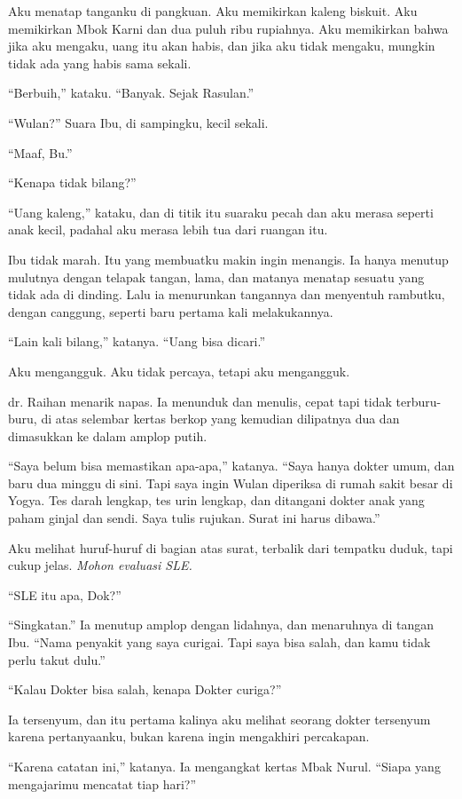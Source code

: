 \documentclass[11pt,twoside,openany]{book}
\begin{document}
Aku menatap tanganku di pangkuan. Aku memikirkan kaleng biskuit. Aku memikirkan Mbok Karni dan dua puluh ribu rupiahnya. Aku memikirkan bahwa jika aku mengaku, uang itu akan habis, dan jika aku tidak mengaku, mungkin tidak ada yang habis sama sekali.

``Berbuih,'' kataku. ``Banyak. Sejak Rasulan.''

``Wulan?'' Suara Ibu, di sampingku, kecil sekali.

``Maaf, Bu.''

``Kenapa tidak bilang?''

``Uang kaleng,'' kataku, dan di titik itu suaraku pecah dan aku merasa seperti anak kecil, padahal aku merasa lebih tua dari ruangan itu.

Ibu tidak marah. Itu yang membuatku makin ingin menangis. Ia hanya menutup mulutnya dengan telapak tangan, lama, dan matanya menatap sesuatu yang tidak ada di dinding. Lalu ia menurunkan tangannya dan menyentuh rambutku, dengan canggung, seperti baru pertama kali melakukannya.

``Lain kali bilang,'' katanya. ``Uang bisa dicari.''

Aku mengangguk. Aku tidak percaya, tetapi aku mengangguk.

dr. Raihan menarik napas. Ia menunduk dan menulis, cepat tapi tidak terburu-buru, di atas selembar kertas berkop yang kemudian dilipatnya dua dan dimasukkan ke dalam amplop putih.

``Saya belum bisa memastikan apa-apa,'' katanya. ``Saya hanya dokter umum, dan baru dua minggu di sini. Tapi saya ingin Wulan diperiksa di rumah sakit besar di Yogya. Tes darah lengkap, tes urin lengkap, dan ditangani dokter anak yang paham ginjal dan sendi. Saya tulis rujukan. Surat ini harus dibawa.''

Aku melihat huruf-huruf di bagian atas surat, terbalik dari tempatku duduk, tapi cukup jelas. \emph{Mohon evaluasi SLE.}

``SLE itu apa, Dok?''

``Singkatan.'' Ia menutup amplop dengan lidahnya, dan menaruhnya di tangan Ibu. ``Nama penyakit yang saya curigai. Tapi saya bisa salah, dan kamu tidak perlu takut dulu.''

``Kalau Dokter bisa salah, kenapa Dokter curiga?''

Ia tersenyum, dan itu pertama kalinya aku melihat seorang dokter tersenyum karena pertanyaanku, bukan karena ingin mengakhiri percakapan.

``Karena catatan ini,'' katanya. Ia mengangkat kertas Mbak Nurul. ``Siapa yang mengajarimu mencatat tiap hari?''
\end{document}
